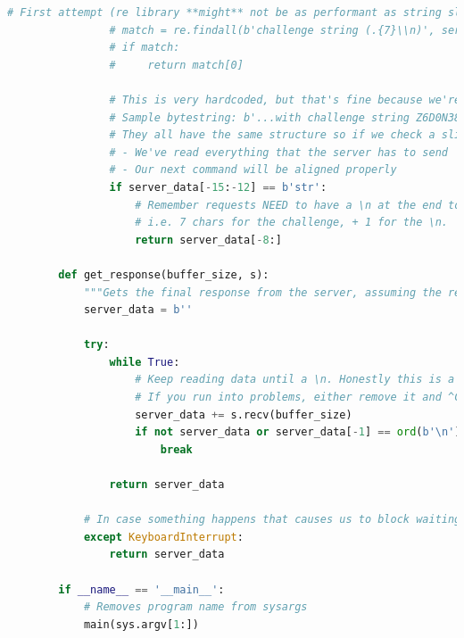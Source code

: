 \documentclass[11pt]{article}
\begin{document}
\begin{lstlisting}[gobble=8,label={lst:full-code},language=Python,basicstyle={\scriptsize\ttfamily}]
                # First attempt (re library **might** not be as performant as string slicing)
                # match = re.findall(b'challenge string (.{7}\\n)', server_data)
                # if match:
                #     return match[0]

                # This is very hardcoded, but that's fine because we're just trying to break THIS protocol.
                # Sample bytestring: b'...with challenge string Z6D0N38\n' (remember, the `\n` is one character!)
                # They all have the same structure so if we check a slice of the output and get "str", we know that:
                # - We've read everything that the server has to send
                # - Our next command will be aligned properly
                if server_data[-15:-12] == b'str':
                    # Remember requests NEED to have a \n at the end to be considered "submitted", so we include that.
                    # i.e. 7 chars for the challenge, + 1 for the \n.
                    return server_data[-8:]

        def get_response(buffer_size, s):
            """Gets the final response from the server, assuming the rest of the protocol executed correctly."""
            server_data = b''

            try:
                while True:
                    # Keep reading data until a \n. Honestly this is a pretty flaky solution because there are 7 \n's in a successful final string, but the chances of a buffered read with a 4096 byte buffer ending on one of those intermediate ones is quite low, at least experimentally.
                    # If you run into problems, either remove it and ^C it yourself, OR use something like socket.select(). This worked for me, though.
                    server_data += s.recv(buffer_size)
                    if not server_data or server_data[-1] == ord(b'\n'):
                        break

                return server_data

            # In case something happens that causes us to block waiting for more data (can sometimes happen), a ^C will print what we captured already
            except KeyboardInterrupt:
                return server_data

        if __name__ == '__main__':
            # Removes program name from sysargs
            main(sys.argv[1:])
    \end{lstlisting}
\end{document}

